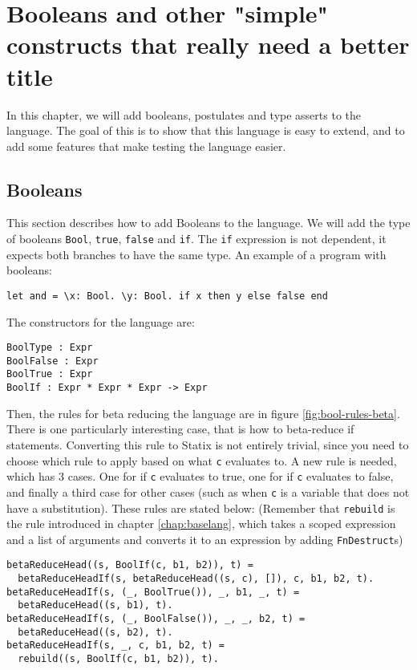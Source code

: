 \chapter{\label{chap:bools}Booleans and other "simple" constructs that really need a better title}

In this chapter, we will add booleans, postulates and type asserts to the language. The goal of this is to show that this language is easy to extend, and to add some features that make testing the language easier.

\section{Booleans}

This section describes how to add Booleans to the language. We will add the type of booleans \verb|Bool|, \verb|true|, \verb|false| and \verb|if|. The \verb|if| expression is not dependent, it expects both branches to have the same type. An example of a program with booleans: 

\begin{lstlisting}
let and = \x: Bool. \y: Bool. if x then y else false end
\end{lstlisting}
The constructors for the language are:

\begin{lstlisting}
BoolType : Expr
BoolFalse : Expr
BoolTrue : Expr
BoolIf : Expr * Expr * Expr -> Expr
\end{lstlisting}
Then, the rules for beta reducing the language are in figure \ref{fig:bool-rules-beta}. There is one particularly interesting case, that is how to beta-reduce if statements. Converting this rule to Statix is not entirely trivial, since you need to choose which rule to apply based on what \verb|c| evaluates to. A new rule is needed, which has 3 cases. One for if \verb|c| evaluates to true, one for if \verb|c| evaluates to false, and finally a third case for other cases (such as when \verb|c| is a variable that does not have a substitution). These rules are stated below: (Remember that \verb|rebuild| is the rule introduced in chapter \ref{chap:baselang}, which takes a scoped expression and a list of arguments and converts it to an expression by adding \verb|FnDestruct|s)

\begin{lstlisting}
betaReduceHead((s, BoolIf(c, b1, b2)), t) = 
  betaReduceHeadIf(s, betaReduceHead((s, c), []), c, b1, b2, t).
betaReduceHeadIf(s, (_, BoolTrue()), _, b1, _, t) = 
  betaReduceHead((s, b1), t).
betaReduceHeadIf(s, (_, BoolFalse()), _, _, b2, t) = 
  betaReduceHead((s, b2), t).
betaReduceHeadIf(s, _, c, b1, b2, t) = 
  rebuild((s, BoolIf(c, b1, b2)), t).
\end{lstlisting}

